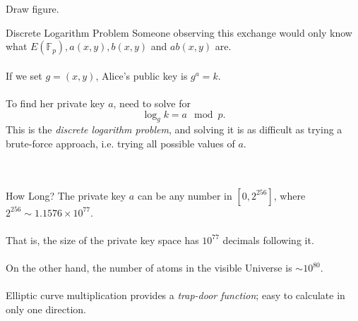 \documentclass{beamer}
\begin{document}
\begin{frame}
	Draw figure.
\end{frame}

\begin{frame}[t]{Discrete Logarithm Problem}
	Someone observing this exchange would only know what $E(\mathbb{F}_{p}), a(x,y), b(x,y)$ and $ab(x,y)$ are. \\~\\
	
	If we set $g = (x,y)$, Alice's public key is $g^{a} = k$. \\~\\
	
	To find her private key $a$, need to solve for
	$$
		\log_{g}k = a \mod p.
	$$
	This is the \emph{discrete logarithm problem}, and solving it is as difficult as trying a brute-force approach, i.e. trying all possible values of $a$. \\~\\\
		
\end{frame}

\begin{frame}[t]{How Long?}
	The private key $a$ can be any number in $[0,2^{256}]$, where $2^{256} \sim 1.1576 \times 10^{77}$. \\~\\
	
	That is, the size of the private key space has $10^{77}$ decimals following it. \\~\\
	
	On the other hand, the number of atoms in the visible Universe is $\sim 10^{80}$. \\~\\
	
	Elliptic curve multiplication provides a \emph{trap-door function}; easy to calculate in only one direction. \\~\\	
\end{frame}

\begin{frame}
	
\end{frame}
\end{document}
